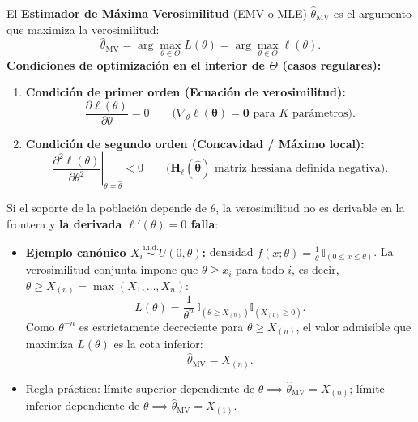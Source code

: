 \documentclass[10pt,a4paper]{article}
\newcommand{\iid}{\overset{\text{i.i.d.}}{\sim}}
\begin{document}
\begin{thmbox}[frametitle={Estimador de Máxima Verosimilitud (EMV)}]
El \textbf{Estimador de Máxima Verosimilitud} (EMV o MLE) $\hat\theta_{\text{MV}}$ es el argumento que maximiza la verosimilitud:
\[
\hat\theta_{\text{MV}} = \arg\max_{\theta\in\Theta} L(\theta) = \arg\max_{\theta\in\Theta} \ell(\theta).
\]
\textbf{Condiciones de optimización en el interior de $\Theta$ (casos regulares):}
\begin{enumerate}
  \item \textbf{Condición de primer orden (Ecuación de verosimilitud):}
  \[
  \frac{\partial \ell(\theta)}{\partial \theta} = 0 \qquad \big(\nabla_\theta \ell(\boldsymbol{\theta}) = \mathbf{0} \text{ para } K \text{ parámetros}\big).
  \]
  \item \textbf{Condición de segundo orden (Concavidad / Máximo local):}
  \[
  \left.\frac{\partial^2 \ell(\theta)}{\partial \theta^2}\right|_{\theta=\hat\theta} < 0 \qquad \big(\mathbf{H}_\ell(\hat{\boldsymbol{\theta}}) \text{ matriz hessiana definida negativa}\big).
  \]
\end{enumerate}
\end{thmbox}

\begin{warnbox}[frametitle={Soporte dependiente del parámetro (Fallo del cálculo diferencial)}]
Si el soporte de la población depende de $\theta$, la verosimilitud no es derivable en la frontera y \textbf{la derivada $\ell'(\theta)=0$ falla}:
\begin{itemize}
  \item \textbf{Ejemplo canónico $X_i \iid U(0,\theta)$:} densidad $f(x;\theta) = \frac{1}{\theta}\,\mathbb{I}_{(0 \le x \le \theta)}$. La verosimilitud conjunta impone que $\theta \ge x_i$ para todo $i$, es decir, $\theta \ge X_{(n)} = \max(X_1,\dots,X_n)$:
  \[
  L(\theta) = \frac{1}{\theta^n}\,\mathbb{I}_{(\theta \ge X_{(n)})} \mathbb{I}_{(X_{(1)} \ge 0)}.
  \]
  Como $\theta^{-n}$ es estrictamente decreciente para $\theta \ge X_{(n)}$, el valor admisible que maximiza $L(\theta)$ es la cota inferior:
  \[
  \hat\theta_{\text{MV}} = X_{(n)}.
  \]
  \item Regla práctica: límite superior dependiente de $\theta \implies \hat\theta_{\text{MV}} = X_{(n)}$; límite inferior dependiente de $\theta \implies \hat\theta_{\text{MV}} = X_{(1)}$.
\end{itemize}
\end{warnbox}

\end{document}

